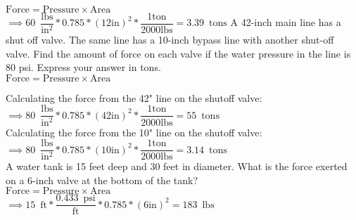 $\textrm{Force}= \textrm{Pressure} \times \textrm{Area}$\\
\vspace{0.3cm}
$\implies 60 \enspace \dfrac{\mathrm{lbs}}{\mathrm{in^2}}*0.785 *(12 \mathrm{in})^2*\dfrac{1 \mathrm{ton}}{2000 \mathrm{lbs}} =\boxed{3.39 \enspace\mathrm{tons}}$
\vspace{0.3cm}
  A 42-inch main line has a shut off valve. The same line has a 10-inch bypass line with another shut-off valve. Find the amount of force on each valve if the water pressure in the line is 80 psi. Express your answer in tons.\\

\vspace{0.5cm}
$\textrm{Force}= \textrm{Pressure} \times \textrm{Area}$\\
\vspace{0.5cm}

\vspace{0.5cm}
Calculating the force from the 42" line on the shutoff valve:\\

\vspace{0.3cm}
$\implies 80 \enspace \dfrac{\mathrm{lbs}}{\mathrm{in^2}}*0.785 *(42 \mathrm{in})^2*\dfrac{1 \mathrm{ton}}{2000 \mathrm{lbs}} =\boxed{55 \enspace\mathrm{tons}}$\\

\vspace{0.3cm}
Calculating the force from the 10" line on the shutoff valve:\\

\vspace{0.3cm}
$\implies 80 \enspace \dfrac{\mathrm{lbs}}{\mathrm{in^2}}*0.785 *(10 \mathrm{in})^2*\dfrac{1 \mathrm{ton}}{2000 \mathrm{lbs}} =\boxed{3.14 \enspace\mathrm{tons}}$\\

  A water tank is 15 feet deep and 30 feet in diameter. What is the force exerted on a 6-inch valve at the bottom of the tank?\\
\vspace{0.5cm}
$\textrm{Force}= \textrm{Pressure} \times \textrm{Area}$\\
\vspace{0.5cm}
$\implies 15 \enspace\mathrm{ft}* \dfrac{0.433 \enspace \mathrm{psi}}{\mathrm{ft}}*0.785 *(6 \mathrm{in})^2 =\boxed{183 \enspace\mathrm{lbs}}$\\
\vspace{0.3cm}

\vspace{1cm}

